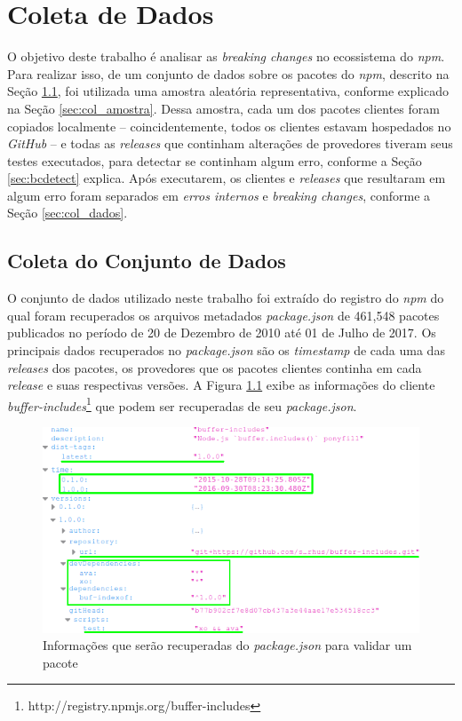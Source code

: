 \chapter{Coleta de Dados}
\label{cap:metodologia}

O objetivo deste trabalho é analisar as \textit{breaking changes} no ecossistema do \textit{npm}. Para realizar isso, de um conjunto de dados sobre os pacotes do \textit{npm}, descrito na Seção \ref{sec:col_base}, foi utilizada uma amostra aleatória representativa, conforme explicado na Seção \ref{sec:col_amostra}. Dessa amostra, cada um dos pacotes clientes foram copiados localmente -- coincidentemente, todos os clientes estavam hospedados no \textit{GitHub} -- e todas as \textit{releases} que continham alterações de provedores tiveram seus testes executados, para detectar se continham algum erro, conforme a Seção \ref{sec:bcdetect} explica. Após executarem, os clientes e \textit{releases} que resultaram em algum erro foram separados em \textit{erros internos} e \textit{breaking changes}, conforme a Seção \ref{sec:col_dados}.

\section{Coleta do Conjunto de Dados}
\label{sec:col_base}
O conjunto de dados utilizado neste trabalho foi extraído do registro do \textit{npm} do qual foram recuperados os arquivos metadados \textit{package.json} de 461,548 pacotes publicados no período de 20 de Dezembro de 2010 até 01 de Julho de 2017. Os principais dados recuperados no \textit{package.json} são os \textit{timestamp} de cada uma das \textit{releases} dos pacotes, os provedores que os pacotes clientes continha em cada \textit{release} e suas respectivas versões. A Figura \ref{fig:package_json} exibe as informações do cliente \textit{buffer-includes}\footnote{http://registry.npmjs.org/buffer-includes} que podem ser recuperadas de seu \textit{package.json}.

\begin{figure}
    \centering
    \includegraphics[scale=0.5]{figuras/package_json.png}
    \caption{Informações que serão recuperadas do \textit{package.json} para validar um pacote}
    \label{fig:package_json}
\end{figure}{}

